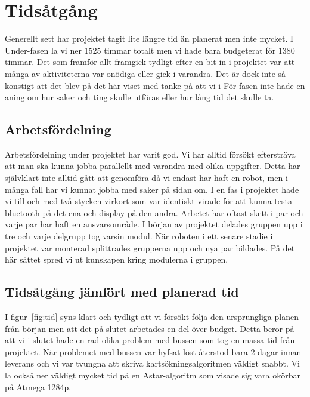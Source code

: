 \documentclass[a4paper,12pt,fleqn]{article}
\begin{document}
\addto\captionsswedish{\renewcommand{\contentsname}{Innehållsförteckning}}

\tableofcontents
\newpage
\pagestyle{fancy}


\section{Tidsåtgång}
Generellt sett har projektet tagit lite längre tid än planerat men inte mycket. I Under-fasen la vi ner 1525 timmar totalt men vi hade bara budgeterat för 1380 timmar. Det som framför allt framgick tydligt efter en bit in i projektet var att många av aktiviteterna var onödiga eller gick i varandra. Det är dock inte så konstigt att det blev på det här viset med tanke på att vi i För-fasen inte hade en aning om hur saker och ting skulle utföras eller hur lång tid det skulle ta. 

\subsection{Arbetsfördelning}
Arbetsfördelning under projektet har varit god. Vi har alltid försökt eftersträva att man ska kunna jobba parallellt med varandra med olika uppgifter. Detta har självklart inte alltid gått att genomföra då vi endast har haft en robot, men i många fall har vi kunnat jobba med saker på sidan om. I en fas i projektet hade vi till och med två stycken virkort som var identiskt virade för att kunna testa bluetooth på det ena och display på den andra. Arbetet har oftast skett i par och varje par har haft en ansvarsområde. I början av projektet delades gruppen upp i tre och varje delgrupp tog varsin modul. När roboten i ett senare stadie i projektet var monterad splittrades grupperna upp och nya par bildades. På det här sättet spred vi ut kunskapen kring modulerna i gruppen. 

\subsection{Tidsåtgång jämfört med planerad tid}
I figur~\ref{fig:tid} syns klart och tydligt att vi försökt följa den ursprungliga planen från början men att det på slutet arbetades en del över budget. Detta beror på att vi i slutet hade en rad olika problem med bussen som tog en massa tid från projektet. När problemet med bussen var hyfsat löst återstod bara 2 dagar innan leverans och vi var tvungna att skriva kartsökningsalgoritmen väldigt snabbt. Vi la också ner väldigt mycket tid på en Astar-algoritm som visade sig vara okörbar på Atmega 1284p. 
\end{document}
